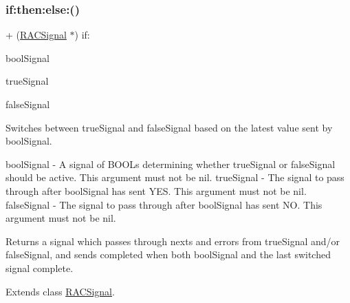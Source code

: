\subsubsection{\texorpdfstring{if\+:then\+:else\+:()}{if:then:else:()}\hspace{0.1cm}{\footnotesize\ttfamily [2/3]}}
{\footnotesize\ttfamily + (\mbox{\hyperlink{interface_r_a_c_signal}{R\+A\+C\+Signal}} $\ast$) if\+: \begin{DoxyParamCaption}\item[{(\mbox{\hyperlink{interface_r_a_c_signal}{R\+A\+C\+Signal}} $\ast$)}]{bool\+Signal }\item[{then:(\mbox{\hyperlink{interface_r_a_c_signal}{R\+A\+C\+Signal}} $\ast$)}]{true\+Signal }\item[{else:(\mbox{\hyperlink{interface_r_a_c_signal}{R\+A\+C\+Signal}} $\ast$)}]{false\+Signal }\end{DoxyParamCaption}}

Switches between {\ttfamily true\+Signal} and {\ttfamily false\+Signal} based on the latest value sent by {\ttfamily bool\+Signal}.

bool\+Signal -\/ A signal of B\+O\+O\+Ls determining whether {\ttfamily true\+Signal} or {\ttfamily false\+Signal} should be active. This argument must not be nil. true\+Signal -\/ The signal to pass through after {\ttfamily bool\+Signal} has sent Y\+ES. This argument must not be nil. false\+Signal -\/ The signal to pass through after {\ttfamily bool\+Signal} has sent NO. This argument must not be nil.

Returns a signal which passes through {\ttfamily next}s and {\ttfamily error}s from {\ttfamily true\+Signal} and/or {\ttfamily false\+Signal}, and sends {\ttfamily completed} when both {\ttfamily bool\+Signal} and the last switched signal complete. 

Extends class \mbox{\hyperlink{interface_r_a_c_signal_a67c14dfcf505999bc53632e336f6cb84}{R\+A\+C\+Signal}}.

\mbox{\label{category_r_a_c_signal_07_operations_08_a67c14dfcf505999bc53632e336f6cb84}} 
